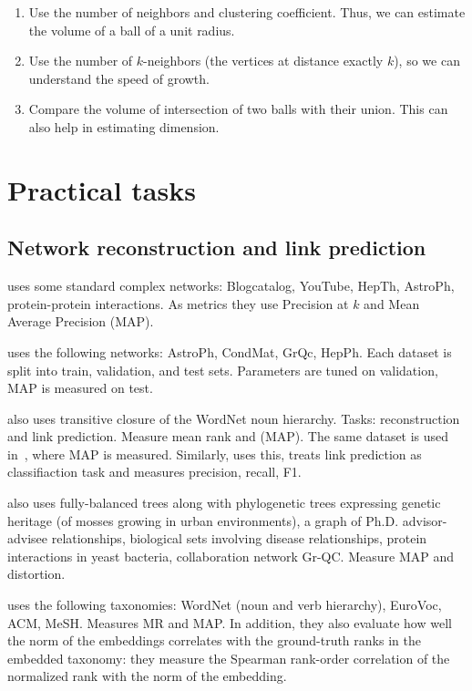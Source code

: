\documentclass{article}
\begin{document}
\begin{enumerate}
    \item Use the number of neighbors and clustering coefficient. Thus, we can estimate the volume of a ball of a unit radius. 
    \item Use the number of $k$-neighbors (the vertices at distance exactly $k$), so we can understand the speed of growth.
    \item Compare the volume of intersection of two balls with their union. This can also help in estimating dimension.
\end{enumerate}
            
\section{Practical tasks}

\subsection{Network reconstruction and link prediction}

\cite{goyal2018graph} uses some standard complex networks: Blogcatalog, YouTube, HepTh, AstroPh, protein-protein interactions. As metrics they use Precision at $k$ and Mean Average Precision (MAP).

\cite{nickel2017poincare} uses the following networks: AstroPh, CondMat, GrQc, HepPh. Each dataset is split into train, validation, and test sets. Parameters are tuned on validation, MAP is measured on test. 

\cite{nickel2017poincare} also uses transitive closure of the WordNet noun hierarchy. Tasks: reconstruction and link prediction. Measure mean rank and (MAP).  The same dataset is used in~\cite{sala2018representation}, where MAP is measured. Similarly, \cite{ganea2018hyperbolic} uses this, treats link prediction as classifiaction task and measures precision, recall, F1.

\cite{sala2018representation} also uses fully-balanced trees along with phylogenetic trees expressing genetic heritage (of mosses growing in urban
environments), a graph of Ph.D. advisor-advisee relationships, biological sets involving disease relationships, protein interactions in yeast bacteria, collaboration network Gr-QC. Measure MAP and distortion. 

\cite{nickel2018learning} uses the following taxonomies: WordNet (noun and verb hierarchy), EuroVoc, ACM, MeSH. Measures MR and MAP. In addition, they also evaluate how well the norm of the embeddings  correlates with
the ground-truth ranks in the embedded taxonomy: they measure the Spearman rank-order correlation of the normalized rank with the norm of the embedding. 
 
\end{document}
